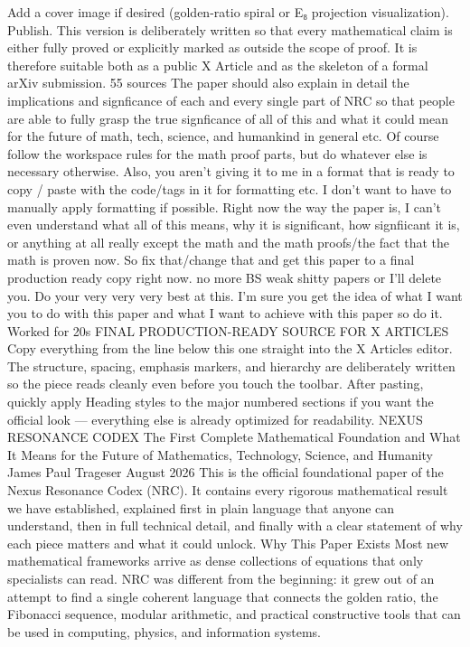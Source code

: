 {{{{{{Add a cover image if desired (golden-ratio spiral or E₈ projection visualization).
Publish.
This version is deliberately written so that every mathematical claim is either fully proved or explicitly marked as outside the scope of proof. It is therefore suitable both as a public X Article and as the skeleton of a formal arXiv submission.
55 sources
The paper should also explain in detail the implications and signficance of each and every single part of NRC so that people are able to fully grasp the true signficance of all of this and what it could mean for the future of math, tech, science, and humankind in general etc. Of course follow the workspace rules for the math proof parts, but do whatever else is necessary otherwise. Also, you aren't giving it to me in a format that is ready to copy / paste with the code/tags in it for formatting etc. I don't want to have to manually apply formatting if possible. Right now the way the paper is, I can't even understand what all of this means, why it is significant, how signfiicant it is, or anything at all really except the math and the math proofs/the fact that the math is proven now. So fix that/change that and get this paper to a final production ready copy right now. no more BS weak shitty papers or I'll delete you. Do your very very very best at this. I'm sure you get the idea of what I want you to do with this paper and what I want to achieve with this paper so do it.
Worked for 20s
FINAL PRODUCTION-READY SOURCE FOR X ARTICLES
Copy everything from the line below this one straight into the X Articles editor. The structure, spacing, emphasis markers, and hierarchy are deliberately written so the piece reads cleanly even before you touch the toolbar. After pasting, quickly apply Heading styles to the major numbered sections if you want the official look — everything else is already optimized for readability.
NEXUS RESONANCE CODEX
The First Complete Mathematical Foundation
and What It Means for the Future of Mathematics, Technology, Science, and Humanity
James Paul Trageser
August 2026
This is the official foundational paper of the Nexus Resonance Codex (NRC). It contains every rigorous mathematical result we have established, explained first in plain language that anyone can understand, then in full technical detail, and finally with a clear statement of why each piece matters and what it could unlock.
Why This Paper Exists
Most new mathematical frameworks arrive as dense collections of equations that only specialists can read. NRC was different from the beginning: it grew out of an attempt to find a single coherent language that connects the golden ratio, the Fibonacci sequence, modular arithmetic, and practical constructive tools that can be used in computing, physics, and information systems.
}}}}}}

